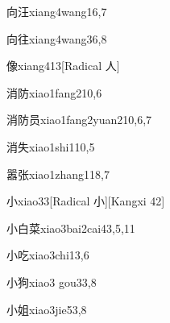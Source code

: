 \begin{verbete}{向汪}{xiang4wang1}{6,7}
\end{verbete}

\begin{verbete}{向往}{xiang4wang3}{6,8}
\end{verbete}

\begin{verbete}{像}{xiang4}{13}[Radical 人]
\end{verbete}

\begin{verbete}{消防}{xiao1fang2}{10,6}
\end{verbete}

\begin{verbete}{消防员}{xiao1fang2yuan2}{10,6,7}
\end{verbete}

\begin{verbete}{消失}{xiao1shi1}{10,5}
\end{verbete}

\begin{verbete}{嚣张}{xiao1zhang1}{18,7}
\end{verbete}

\begin{verbete}{小}{xiao3}{3}[Radical 小][Kangxi 42]
\end{verbete}

\begin{verbete}{小白菜}{xiao3bai2cai4}{3,5,11}
\end{verbete}

\begin{verbete}{小吃}{xiao3chi1}{3,6}
\end{verbete}

\begin{verbete}{小狗}{xiao3 gou3}{3,8}
\end{verbete}

\begin{verbete}{小姐}{xiao3jie5}{3,8}
\end{verbete}

